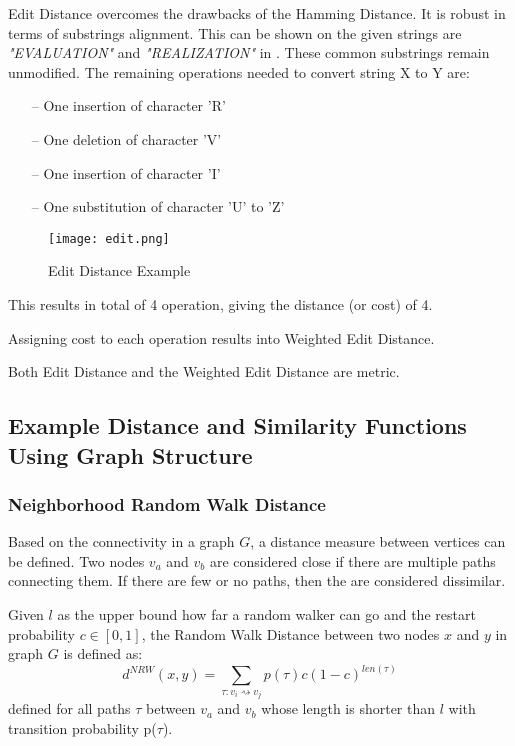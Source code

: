 Edit Distance overcomes the drawbacks of the Hamming Distance. 
It is robust in terms of substrings alignment. 
This can be shown on the given strings are \emph{"EVALUATION"} and \emph{"REALIZATION"} in .
These common substrings remain unmodified. 
The remaining operations needed to convert string X to Y are:
\begin{itemize}
	\item[--] One insertion of character 'R'
	\item[--] One deletion of character 'V'
	\item[--] One insertion of character 'I'
	\item[--] One substitution of character 'U' to 'Z'
\end{itemize}

\begin{figure}[ht]
	\centering
	\texttt{[image: edit.png]}
	\caption{Edit Distance Example} 
	\label{fig:edit}
\end{figure}
This results in total of 4 operation, giving the distance (or cost) of 4.

Assigning cost to each operation results into Weighted Edit Distance\cite{Chen:2004:MLE:1316689.1316758}.

Both Edit Distance and the Weighted Edit Distance are metric.

\subsection{Example Distance and Similarity Functions Using Graph Structure}

\subsubsection{Neighborhood Random Walk Distance}

Based on the connectivity in a graph $G$, a distance measure between vertices can be defined. 
Two nodes $v_{a}$ and $v_{b}$ are considered close if there are multiple paths connecting them. 
If there are few or no paths, then the are considered dissimilar.

\begin{definition}
	Given $l$ as the upper bound how far a random walker can go and the restart probability $c \in [0, 1]$, 
the Random Walk Distance between two nodes  $x$ and $y$ in graph $G$ is defined as:
\begin{equation}
	d^{NRW}(x,y) = \sum_{\tau:v_{i}\rightsquigarrow v_{j}}p(\tau)c(1-c)^{len(\tau)}
\end{equation}
defined for all paths $\tau$ between $v_{a}$ and $v_{b}$ whose length is shorter than $l$ with transition probability p($\tau$). 
\end{definition}

